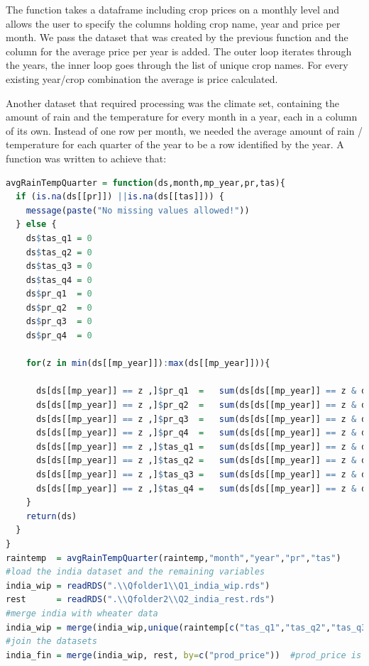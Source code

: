 \documentclass[11pt]{article}
\begin{document}
The function takes a dataframe including crop prices on a monthly level and allows the user to specify the columns holding crop name, year and price per month.
We pass the dataset that was created by the previous function and the column for the average price per year is added. The outer loop iterates through the years, the inner loop goes through the list of unique crop names. For every existing year/crop combination the average is price calculated.

Another dataset that required processing was the climate set, containing the amount of rain and the temperature for every month in a year, each in a column of its own. Instead of one row per month, we needed the average amount of rain / temperature for each quarter of the year to be a row identified by the year.
A function was written to achieve that:

\begin{lstlisting}[language= R, captionpos=b,caption=\href{https://github.com/jaidikam/sps_ws1718/tree/master/Qfolder2}{SPL\_Q2\_india\_finalization}]
avgRainTempQuarter = function(ds,month,mp_year,pr,tas){
  if (is.na(ds[[pr]]) ||is.na(ds[[tas]])) {
    message(paste("No missing values allowed!"))
  } else {
    ds$tas_q1 = 0
    ds$tas_q2 = 0
    ds$tas_q3 = 0
    ds$tas_q4 = 0
    ds$pr_q1  = 0
    ds$pr_q2  = 0
    ds$pr_q3  = 0
    ds$pr_q4  = 0
    
    for(z in min(ds[[mp_year]]):max(ds[[mp_year]])){
      
      ds[ds[[mp_year]] == z ,]$pr_q1  =   sum(ds[ds[[mp_year]] == z & ds[[month]] %in% c("1","2","3"),][[pr]])/3
      ds[ds[[mp_year]] == z ,]$pr_q2  =   sum(ds[ds[[mp_year]] == z & ds[[month]] %in% c("4","5","6"),][[pr]])/3
      ds[ds[[mp_year]] == z ,]$pr_q3  =   sum(ds[ds[[mp_year]] == z & ds[[month]] %in% c("7","8","9"),][[pr]])/3
      ds[ds[[mp_year]] == z ,]$pr_q4  =   sum(ds[ds[[mp_year]] == z & ds[[month]] %in% c("10","11","12"),][[pr]])/3
      ds[ds[[mp_year]] == z ,]$tas_q1 =   sum(ds[ds[[mp_year]] == z & ds[[month]] %in% c("1","2","3"),][[tas]])/3
      ds[ds[[mp_year]] == z ,]$tas_q2 =   sum(ds[ds[[mp_year]] == z & ds[[month]] %in% c("4","5","6"),][[tas]])/3
      ds[ds[[mp_year]] == z ,]$tas_q3 =   sum(ds[ds[[mp_year]] == z & ds[[month]] %in% c("7","8","9"),][[tas]])/3
      ds[ds[[mp_year]] == z ,]$tas_q4 =   sum(ds[ds[[mp_year]] == z & ds[[month]] %in% c("10","11","12"),][[tas]])/3
    }
    return(ds)
  }  
}
raintemp  = avgRainTempQuarter(raintemp,"month","year","pr","tas") 
#load the india dataset and the remaining variables
india_wip = readRDS(".\\Qfolder1\\Q1_india_wip.rds")
rest      = readRDS(".\\Qfolder2\\Q2_india_rest.rds")
#merge india with wheater data
india_wip = merge(india_wip,unique(raintemp[c("tas_q1","tas_q2","tas_q3","tas_q4","pr_q1","pr_q2","pr_q3","pr_q4","year")]),by=c("year")) 
#join the datasets
india_fin = merge(india_wip, rest, by=c("prod_price"))  #prod_price is unique, therefore it can be used as a key for the merge
\end{lstlisting}
\end{document}

